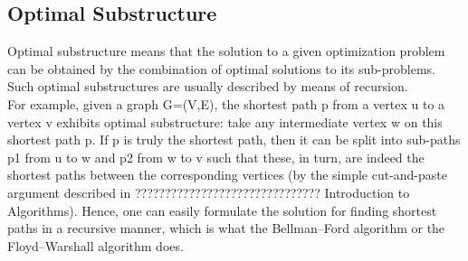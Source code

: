 \documentclass{report}
\begin{document}
    \subsection{Optimal Substructure}
    Optimal substructure means that the solution to a given optimization problem can be obtained by the combination of optimal solutions to its sub-problems. Such optimal substructures are usually described by means of recursion.
    \\
    For example, given a graph G=(V,E), the shortest path p from a vertex u to a vertex v exhibits optimal substructure: take any intermediate vertex w on this shortest path p. If p is truly the shortest path, then it can be split into sub-paths p1 from u to w and p2 from w to v such that these, in turn, are indeed the shortest paths between the corresponding vertices (by the simple cut-and-paste argument described in ??????????????????????????????? Introduction to Algorithms). Hence, one can easily formulate the solution for finding shortest paths in a recursive manner, which is what the Bellman–Ford algorithm or the Floyd–Warshall algorithm does.
    \newpage
\end{document}
